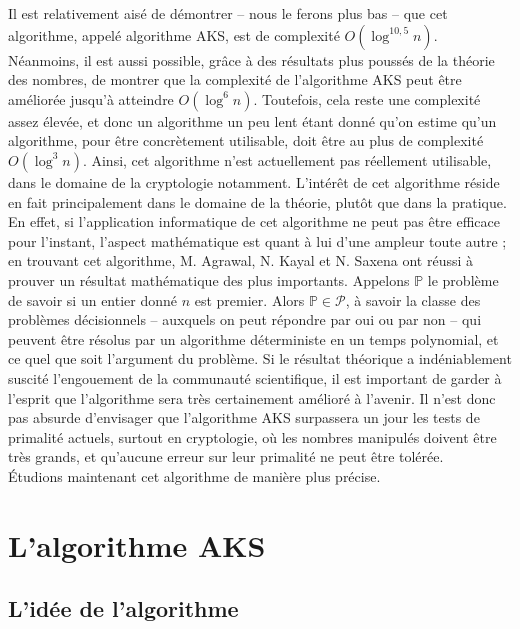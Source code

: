 \documentclass[11pt]{article}
\begin{document}
Il est relativement aisé de démontrer -- nous le ferons plus bas -- que cet algorithme, appelé algorithme AKS, est de complexité $O(\log^{10,5} n)$. Néanmoins, il est aussi possible, grâce à des résultats plus poussés de la théorie des nombres, de montrer que la complexité de l'algorithme AKS peut être améliorée jusqu'à atteindre $O(\log^6 n)$. Toutefois, cela reste une complexité assez élevée, et donc un algorithme un peu lent étant donné qu'on estime qu'un algorithme, pour être concrètement utilisable, doit être au plus de complexité $O(\log^3 n)$. Ainsi, cet algorithme n'est actuellement pas réellement utilisable, dans le domaine de la cryptologie notamment. L'intérêt de cet algorithme réside en fait principalement dans le domaine de la théorie, plutôt que dans la pratique. En effet, si l'application informatique de cet algorithme ne peut pas être efficace pour l'instant, l'aspect mathématique est quant à lui d'une ampleur toute autre ; en trouvant cet algorithme, M. Agrawal, N. Kayal et N. Saxena ont réussi à prouver un résultat mathématique des plus importants. Appelons $\mathbb{P}$ le problème de savoir si un entier donné $n$ est premier. Alors $\mathbb{P} \in \mathcal{P}$, à savoir la classe des problèmes décisionnels -- auxquels on peut répondre par oui ou par non -- qui peuvent être résolus par un algorithme déterministe en un temps polynomial, et ce quel que soit l'argument du problème. Si le résultat théorique a indéniablement suscité l'engouement de la communauté scientifique, il est important de garder à l'esprit que l'algorithme sera très certainement amélioré à l'avenir. Il n'est donc pas absurde d'envisager que l'algorithme AKS surpassera un jour les tests de primalité actuels, surtout en cryptologie, où les nombres manipulés doivent être très grands, et qu'aucune erreur sur leur primalité ne peut être tolérée.\\

Étudions maintenant cet algorithme de manière plus précise.

\newpage


\section{L'algorithme AKS}

\subsection{L'idée de l'algorithme}
\end{document}
